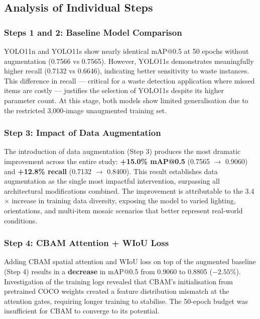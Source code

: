 \subsection{Analysis of Individual Steps}

\subsubsection{Steps 1 and 2: Baseline Model Comparison}

YOLO11n and YOLO11s show nearly identical mAP@0.5 at 50 epochs without augmentation (0.7566 vs 0.7565). However, YOLO11s demonstrates meaningfully higher recall (0.7132 vs 0.6646), indicating better sensitivity to waste instances. This difference in recall — critical for a waste detection application where missed items are costly — justifies the selection of YOLO11s despite its higher parameter count. At this stage, both models show limited generalisation due to the restricted 3,000-image unaugmented training set.

\subsubsection{Step 3: Impact of Data Augmentation}

The introduction of data augmentation (Step 3) produces the most dramatic improvement across the entire study: \textbf{+15.0\% mAP@0.5} (0.7565 $\rightarrow$ 0.9060) and \textbf{+12.8\% recall} (0.7132 $\rightarrow$ 0.8400). This result establishes data augmentation as the single most impactful intervention, surpassing all architectural modifications combined. The improvement is attributable to the 3.4$\times$ increase in training data diversity, exposing the model to varied lighting, orientations, and multi-item mosaic scenarios that better represent real-world conditions.

\subsubsection{Step 4: CBAM Attention + WIoU Loss}

Adding CBAM spatial attention and WIoU loss on top of the augmented baseline (Step 4) results in a \textbf{decrease} in mAP@0.5 from 0.9060 to 0.8805 ($-2.55\%$). Investigation of the training logs revealed that CBAM's initialisation from pretrained COCO weights created a feature distribution mismatch at the attention gates, requiring longer training to stabilise. The 50-epoch budget was insufficient for CBAM to converge to its potential.

